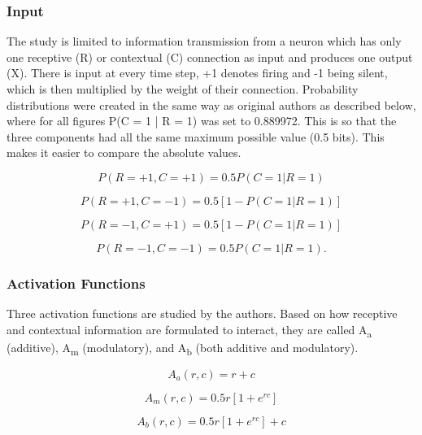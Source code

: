 \subsubsection{Input}
The study is limited to information transmission from a neuron which has only one receptive (R) or contextual (C) connection as input and produces one output (X). There is input at every time step, +1 denotes firing and -1 being silent, which is then multiplied by the weight of their connection. Probability distributions were created in the same way as original authors as described below, where for all figures P(C = 1 | R = 1) was set to 0.889972. This is so that the three components had all the same maximum possible value (0.5 bits). This makes it easier to compare the absolute values. 

\begin{equation}
P(R = +1, C = +1) = 0.5P(C = 1 | R = 1)
\end{equation}

\begin{equation}
P(R =+1, C = -1) = 0.5[1 - P(C = 1 | R = 1)]
\end{equation}

\begin{equation}
P(R = -1, C = +1) = 0.5[1 - P(C = 1 | R = 1)]
\end{equation}

\begin{equation}
P(R = -1, C = -1) = 0.5P(C = 1 | R = 1).
\end{equation}


\subsubsection{Activation Functions}
Three activation functions are studied by the authors. Based on how receptive and contextual information are formulated to interact, they are called A\textsubscript{a} (additive), A\textsubscript{m} (modulatory), and A\textsubscript{b} (both additive and modulatory). 

\begin{equation}
A_a(r,c) = r + c 
\end{equation}

\begin{equation}
A_m(r,c) = 0.5r[1 + e^{rc}] 
\end{equation}

\begin{equation}
A_b(r,c) = 0.5r[1 + e^{rc}] + c  
\end{equation}


